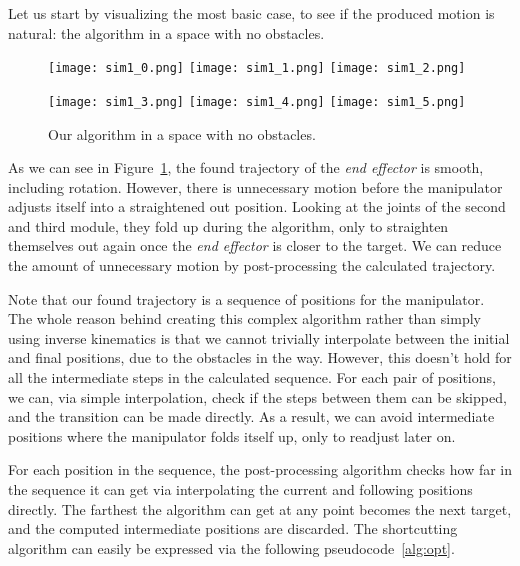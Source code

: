 Let us start by visualizing the most basic case, to see if the produced motion is natural: the algorithm in a space with no obstacles.

\begin{figure}
  \centering
  \begin{minipage}{\textwidth}
    \texttt{[image: sim1\_0.png]}
    \texttt{[image: sim1\_1.png]}
    \texttt{[image: sim1\_2.png]}

    \texttt{[image: sim1\_3.png]}
    \texttt{[image: sim1\_4.png]}
    \texttt{[image: sim1\_5.png]}
  \end{minipage}
  \caption{Our algorithm in a space with no obstacles.}\label{fig:sim1}
\end{figure}

As we can see in Figure~\ref{fig:sim1}, the found trajectory of the \textit{end effector} is smooth, including rotation. However, there is unnecessary motion before the manipulator adjusts itself into a straightened out position. Looking at the joints of the second and third module, they fold up during the algorithm, only to straighten themselves out again once the \textit{end effector} is closer to the target. We can reduce the amount of unnecessary motion by post-processing the calculated trajectory.

Note that our found trajectory is a sequence of positions for the manipulator. The whole reason behind creating this complex algorithm rather than simply using inverse kinematics is that we cannot trivially interpolate between the initial and final positions, due to the obstacles in the way. However, this doesn't hold for all the intermediate steps in the calculated sequence. For each pair of positions, we can, via simple interpolation, check if the steps between them can be skipped, and the transition can be made directly. As a result, we can avoid intermediate positions where the manipulator folds itself up, only to readjust later on.

For each position in the sequence, the post-processing algorithm checks how far in the sequence it can get via interpolating the current and following positions directly. The farthest the algorithm can get at any point becomes the next target, and the computed intermediate positions are discarded. The shortcutting algorithm can easily be expressed via the following pseudocode~\ref{alg:opt}.


